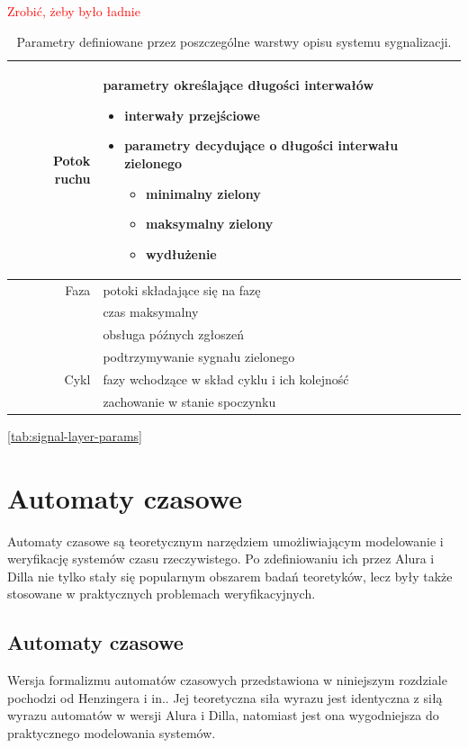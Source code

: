 \documentclass{pracamgr}
\newcommand{\todo}[1]{\textcolor{red}{#1}}
\theoremstyle{plain}
\begin{document}
\todo{Zrobić, żeby było ładnie}
\begin{table}[ht] \centering
  \begin{tabular}{|r|p{8cm}|} \hline Potok ruchu & parametry
określające długości interwałów
    \begin{itemize}
      \item interwały przejściowe
      \item parametry decydujące o długości interwału zielonego
      \begin{itemize}
        \item minimalny zielony
        \item maksymalny zielony
        \item wydłużenie
      \end{itemize}
    \end{itemize} \\\hline Faza & potoki składające się na fazę \\ &
czas maksymalny \\ & obsługa późnych zgłoszeń \\ & podtrzymywanie
sygnału zielonego \\\hline Cykl & fazy wchodzące w skład cyklu i ich
kolejność \\ & zachowanie w stanie spoczynku\\\hline
  \end{tabular}
  \caption{Parametry definiowane przez poszczególne warstwy opisu
systemu sygnalizacji.}  \ref{tab:signal-layer-params}
\end{table}

\chapter{Automaty czasowe}
\label{c:ta} Automaty czasowe są teoretycznym narzędziem
umożliwiającym modelowanie i weryfikację systemów czasu
rzeczywistego. Po zdefiniowaniu ich przez Alura i Dilla nie tylko
stały się popularnym obszarem badań teoretyków, lecz były także
stosowane w praktycznych problemach weryfikacyjnych.

\section{Automaty czasowe} Wersja formalizmu automatów czasowych
przedstawiona w niniejszym rozdziale pochodzi od Henzingera i
in.\cite{henz-94}. Jej teoretyczna siła wyrazu jest identyczna z siłą
wyrazu automatów w wersji Alura i Dilla, natomiast jest ona
wygodniejsza do praktycznego modelowania systemów.
\end{document}
